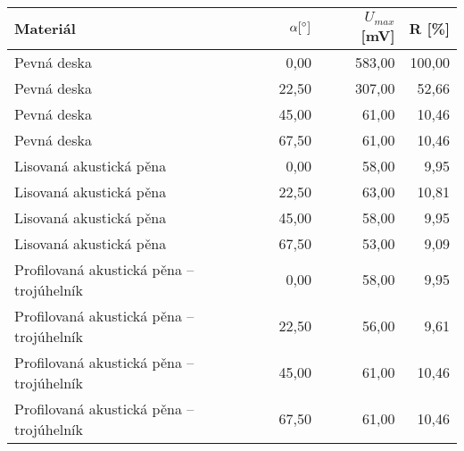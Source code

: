 \begin{tabular}{lrrr}
\toprule
Materiál & $\alpha [\unit{{\degree}}]$ & $U_{{max}}$ [\unit{{\mV}}] & R [\unit{{\percent}}] \\
\midrule
Pevná deska & 0,00 & 583,00 & 100,00 \\
Pevná deska & 22,50 & 307,00 & 52,66 \\
Pevná deska & 45,00 & 61,00 & 10,46 \\
Pevná deska & 67,50 & 61,00 & 10,46 \\
Lisovaná akustická pěna & 0,00 & 58,00 & 9,95 \\
Lisovaná akustická pěna & 22,50 & 63,00 & 10,81 \\
Lisovaná akustická pěna & 45,00 & 58,00 & 9,95 \\
Lisovaná akustická pěna & 67,50 & 53,00 & 9,09 \\
Profilovaná akustická pěna -- trojúhelník & 0,00 & 58,00 & 9,95 \\
Profilovaná akustická pěna -- trojúhelník & 22,50 & 56,00 & 9,61 \\
Profilovaná akustická pěna -- trojúhelník & 45,00 & 61,00 & 10,46 \\
Profilovaná akustická pěna -- trojúhelník & 67,50 & 61,00 & 10,46 \\
\bottomrule
\end{tabular}
